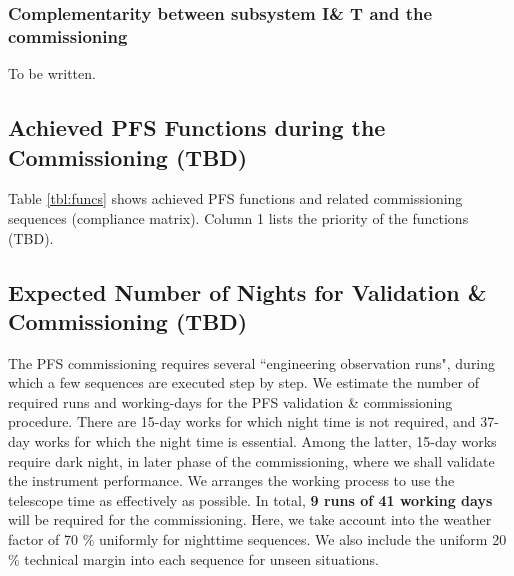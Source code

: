 
\subsubsection{Complementarity between subsystem I\& T and the commissioning}
To be written.







\subsection{Achieved PFS Functions during the Commissioning (TBD)}\label{sec:cmatrix}
Table \ref{tbl:funcs} shows achieved PFS functions and related commissioning sequences (compliance matrix).
Column 1 lists the priority of the functions (TBD).



\subsection{Expected Number of Nights for Validation \& Commissioning (TBD)}
The PFS commissioning requires several ``engineering observation runs", during which a few sequences are executed step by step.
We estimate the number of required runs and working-days for the PFS validation \& commissioning procedure.
There are 15-day works for which night time is not required, and 37-day works for which the night time is essential.
Among the latter, 15-day works require dark night, in later phase of the commissioning, where we shall validate the instrument performance.
We arranges the working process to use the telescope time as effectively as possible.
In total, {\bf 9 runs of 41 working days} will be  required for the commissioning. 
Here, we take account into the weather factor of 70 \% uniformly  for nighttime sequences.
We also include the uniform 20 \% technical margin into each sequence for unseen situations.

